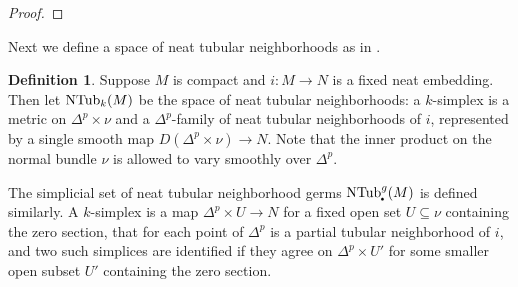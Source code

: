 \documentclass[11pt]{amsart}
\theoremstyle{definition}
\newtheorem{defn}{Definition}[section]
\numberwithin{equation}{section}
\numberwithin{figure}{section}
\newcommand{\R}{\mathbb R}
\newcommand{\NTub}{\textup{NTub}}
\newcommand{\sbt}{\,\begin{picture}(-1,1)(0.5,-1)\circle*{1.8}\end{picture}\hspace{.05cm}}
\begin{document}
\begin{proof}
%	
\end{proof}

Next we define a space of neat tubular neighborhoods as in \cite{GIMM1}.

\begin{defn}\label{tubular_nbhd_space}
Suppose $M$ is compact and $i\colon M \to N$ is a fixed neat embedding. Then let $\NTub_k(M)$ be the space of neat tubular neighborhoods: a $k$-simplex is a metric on $\Delta^p \times \nu$ and a $\Delta^p$-family of neat tubular neighborhoods of $i$, represented by a single smooth map $D(\Delta^p \times \nu) \to N$. %
Note that the inner product on the normal bundle $\nu$ is allowed to vary smoothly over $\Delta^p$.

The simplicial set of neat tubular neighborhood germs $\NTub_{\sbt}^g(M)$ is defined similarly. A $k$-simplex is a map $\Delta^p \times U \to N$ for a fixed open set $U \subseteq \nu$ containing the zero section, that for each point of $\Delta^p$ is a partial tubular neighborhood of $i$, and two such simplices are identified if they agree on $\Delta^p \times U'$ for some smaller open subset $U'$ containing the zero section.
\end{defn}
\end{document}
